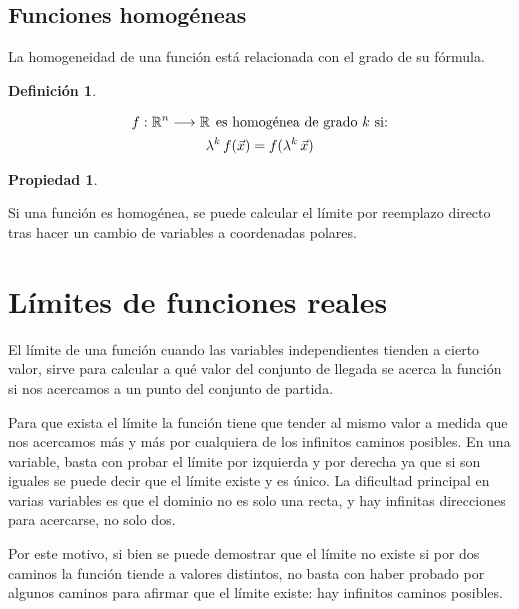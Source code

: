 \documentclass[a5paper,12pt,twoside]{book}
\newtheorem{defn}{{Definición}}[chapter]
\newtheorem{prop}{{Propiedad}}[chapter]
\begin{document}
\section{Funciones homogéneas}

La homogeneidad de una función está relacionada con el grado de su fórmula.

\begin{mdframed}[style=MyFrame1]
    \begin{defn}
    \end{defn}
    \begin{gather*}
        f:\mathbb{R}^n \longrightarrow \mathbb{R} \hspace{1ex} \textrm{es homogénea de grado $k$ si:}
        \\
        \lambda^k \, f(\Vec{x}) = f(\lambda^k \, \Vec{x})
    \end{gather*}
\end{mdframed}

\begin{mdframed}[style=MyFrame1]
    \begin{prop}
    \end{prop}
    Si una función es homogénea, se puede calcular el límite por reemplazo directo tras hacer un cambio de variables a coordenadas polares.
\end{mdframed}


\chapter{Límites de funciones reales}

El límite de una función cuando las variables independientes tienden a cierto valor, sirve para calcular a qué valor del conjunto de llegada se acerca la función si nos acercamos a un punto del conjunto de partida.

Para que exista el límite la función tiene que tender al mismo valor a medida que nos acercamos más y más por cualquiera de los infinitos caminos posibles. En una variable, basta con probar el límite por izquierda y por derecha ya que si son iguales se puede decir que el límite existe y es único. La dificultad principal en varias variables es que el dominio no es solo una recta, y hay infinitas direcciones para acercarse, no solo dos.

Por este motivo, si bien se puede demostrar que el límite no existe si por dos caminos la función tiende a valores distintos, no basta con haber probado por algunos caminos para afirmar que el límite existe: hay infinitos caminos posibles.
\end{document}
